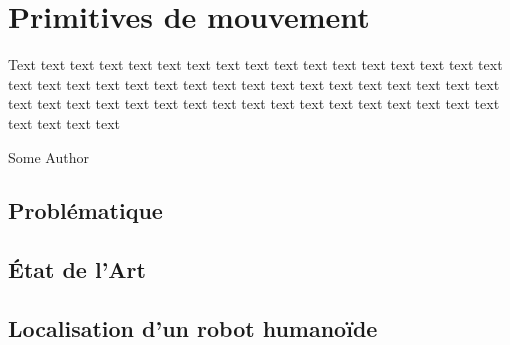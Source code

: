 \chapter{Primitives de mouvement}
\label{chap:primitive}

\epigraph{Text text text text text text text text text text text text
  text text text text text text text text text text text text text
  text text text text text text text text text text text text text
  text text text text text text text text text text text text text
  text text text text}{Some Author}
\clearpage

\section{Problématique}
\section{\'Etat de l'Art}
\section{Localisation d'un robot humanoïde}
